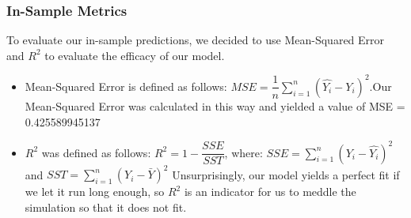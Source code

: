 \documentclass[letterpaper]{article}
\begin{document}
	\subsubsection{In-Sample Metrics}
	To evaluate our in-sample predictions, we decided to use Mean-Squared Error and $R^2$ to evaluate the efficacy of our model.
	\begin{itemize}
		\item Mean-Squared Error is defined as follows: $MSE = \dfrac{1}{n}\sum_{i=1}^{n}(\hat{Y_{i}} - Y_i)^2$.\newline Our Mean-Squared Error was calculated in this way and yielded a value of MSE = 0.425589945137
		\item $R^2$ was defined as follows: $R^2 = 1 - \dfrac{SSE}{SST}$, where:
		\newline $SSE = \sum_{i=1}^{n} (Y_i - \hat{Y_i})^2$ and $SST = \sum_{i=1}^{n} (Y_i - \bar{Y})^2$
		Unsurprisingly, our model yields a perfect fit if we let it run long enough, so $R^2$ is an indicator for us to meddle the simulation so that it does not fit.
	\end{itemize}
	
	
\end{document}
